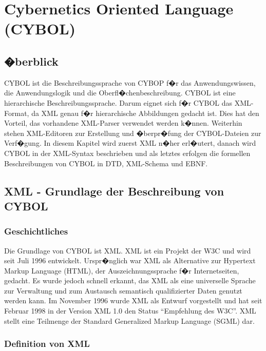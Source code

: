 \chapter{Cybernetics Oriented Language (CYBOL)} 

  \section{�berblick}
    
    CYBOL ist die Beschreibungssprache von CYBOP f�r das Anwendungswissen, die
    Anwendungslogik und die Oberfl�chenbeschreibung. 
    CYBOL ist eine hierarchische Beschreibungssprache. Darum eignet sich f�r CYBOL
    das XML-Format, da XML genau f�r hierarchische Abbildungen gedacht ist.
    Dies hat den Vorteil, das vorhandene XML-Parser verwendet werden k�nnen.
    Weiterhin stehen XML-Editoren zur
    Erstellung und �berpr�fung der CYBOL-Dateien zur Verf�gung.
    In diesem Kapitel wird zuerst XML n�her erl�utert, danach wird CYBOL 
    in der XML-Syntax beschrieben und als letztes erfolgen
    die formellen Beschreibungen von CYBOL in DTD, XML-Schema und EBNF.

  \section{XML - Grundlage der Beschreibung von CYBOL}

    \subsection{Geschichtliches}
    
      Die Grundlage von CYBOL ist XML. XML ist ein Projekt der W3C und wird seit 
      Juli 1996 entwickelt. Urspr�nglich war XML als Alternative zur 
      Hypertext Markup Language (HTML), der Auszeichnungssprache f�r
      Internetseiten, gedacht. Es wurde jedoch schnell erkannt, das XML als 
      eine universelle Sprache zur Verwaltung und zum Austausch semantisch 
      qualifizierter Daten genutzt werden kann. Im November 1996 wurde 
      XML als Entwurf vorgestellt und hat seit Februar 
      1998 in der Version XML 1.0 den Status "`Empfehlung des W3C"'. XML stellt
      eine Teilmenge der Standard Generalized Markup Language (SGML) dar.

    \subsection{Definition von XML}
    
